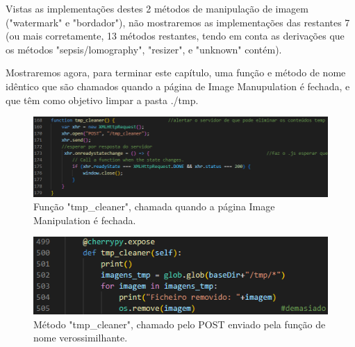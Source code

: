 \documentclass{report}
\begin{document}
\newpage

    Vistas as implementações destes 2 métodos de manipulação de imagem ("watermark" e "bordador"), não mostraremos as implementações das restantes 7 (ou mais corretamente, 13 métodos restantes, tendo em conta as derivações que os métodos "sepsis/lomography", "resizer", e "unknown" contém).
    

\linebreak
 \bigskip

 Mostraremos agora, para terminar este capítulo, uma função e método de nome idêntico que são chamados quando a página de Image Manupulation é fechada, e que têm como objetivo limpar a pasta ./tmp.

\linebreak
 \bigskip
 

\begin{figure}[!hbtp]
        \centering
        \includegraphics[scale=0.6]{Images_code/12 - image manipulation js tmp_cleaner.png}
        \caption{\label{Estrutura}Função "tmp\_cleaner", chamada quando a página Image Manipulation é fechada.}
\end{figure}

\linebreak
 \bigskip

\begin{figure}[!hbtp]
        \centering
        \includegraphics[scale=0.9]{Images_code/12 - image manipulation app tmp_cleaner.png}
        \caption{\label{Estrutura}Método "tmp\_cleaner", chamado pelo POST enviado pela função de nome verossimilhante.}
\end{figure}

\newpage
\end{document}
